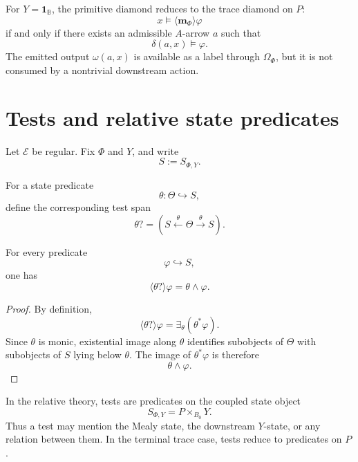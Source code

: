 \begin{corollary}
\label{cor:terminal-primitive-diamond}
For \(Y=\mathbf 1_{\mathbb B}\), the primitive diamond reduces to the trace
diamond on \(P\):
\[
x\models\langle \mathbf m_\Phi\rangle\varphi
\]
if and only if there exists an admissible \(A\)-arrow \(a\) such that
\[
\delta(a,x)\models\varphi.
\]
The emitted output \(\omega(a,x)\) is available as a label through
\(\Omega_\Phi\), but it is not consumed by a nontrivial downstream action.
\end{corollary}

\section{Tests and relative state predicates}
\label{sec:tests-relative-state-predicates}

Let \(\mathcal E\) be regular. Fix \(\Phi\) and \(Y\), and write
\[
S:=S_{\Phi,Y}.
\]

\begin{definition}[Test]
\label{def:relative-test}
For a state predicate
\[
\theta:\Theta\hookrightarrow S,
\]
define the corresponding test span
\[
\theta?
=
\left(
S\xleftarrow{\theta}\Theta\xrightarrow{\theta}S
\right).
\]
\end{definition}

\begin{proposition}
\label{prop:relative-test-diamond-law}
For every predicate
\[
\varphi\hookrightarrow S,
\]
one has
\[
\langle\theta?\rangle\varphi
=
\theta\wedge\varphi.
\]
\end{proposition}

\begin{proof}
By definition,
\[
\langle\theta?\rangle\varphi
=
\exists_\theta(\theta^\ast\varphi).
\]
Since \(\theta\) is monic, existential image along \(\theta\) identifies
subobjects of \(\Theta\) with subobjects of \(S\) lying below \(\theta\). The
image of \(\theta^\ast\varphi\) is therefore
\[
\theta\wedge\varphi.
\]
\end{proof}

\begin{remark}
\label{rem:relative-tests-interpretation}
In the relative theory, tests are predicates on the coupled state object
\[
S_{\Phi,Y}=P\times_{B_0}Y.
\]
Thus a test may mention the Mealy state, the downstream \(Y\)-state, or any
relation between them. In the terminal trace case, tests reduce to predicates
on \(P\).
\end{remark}

